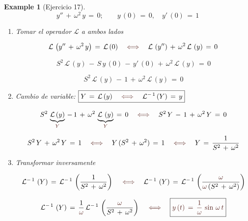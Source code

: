 \documentclass[a4paper,11pt,openany]{book}
\newtheorem{exmp}{Example}[section]
\newcommand*{\itembolasazules}[1]{%
\footnotesize\protect\tikz[baseline=-3pt]%
\protect\node[scale=.7, circle, shade, ball
color=green]{\color{white}\Large\bf#1};}
\begin{document}
\newpage
 
\begin{exmp}[Ejercicio 17]

$$y''\,+\,\omega^{2}\,y\,=\,0; \qquad y\,(0)\,=\,0, \quad y'\,(0)\,=\,1$$
 
\begin{enumerate}[label=\itembolasazules{\arabic*}]
 
 
\item Tomar el operador $\mathcal{L}$ a ambos lados
 
$$\mathcal{L}\,\left(y''\,+\,\omega^{2}\,y \right)\,=\,\mathcal{L}\,(0) \quad \textcolor{caputmortuum}{\iff} \quad \mathcal{L}\,\left(y'' \right)\,+\,\omega^{2}\,\mathcal{L}\,\left(y \right)\,=\,0$$
 
$$S^{2}\,\mathcal{L}\,(y)\,-\,S\,y\,(0)\,-\,y'\,(0)\,+\,\omega^{2}\,\mathcal{L}\,\left(y \right)\,=\,0$$
 
$$S^{2}\,\mathcal{L}\,(y)\,-\,1\,+\,\omega^{2}\,\mathcal{L}\,\left(y \right)\,=\,0$$
 
\item Cambio de variable: $\boxed{Y\,=\,\mathcal{L}\,(y) \quad \textcolor{caputmortuum}{\iff} \quad \mathcal{L}^{-\,1}\,(Y)\,=\,y  }$
 
$$S^{2}\,\underbrace{\mathcal{L}\,(y)}_{\textcolor{caputmortuum}{Y} }\,-\,1\,+\,\omega^{2}\,\underbrace{\mathcal{L}\,\left(y \right)}_{\textcolor{caputmortuum}{Y} }\,=\,0 \quad \textcolor{caputmortuum}{\iff} \quad S^{2}\,Y\,-\,1\,+\,\omega^{2}\,Y\,=\,0$$
 
$$S^{2}\,Y\,+\,\omega^{2}\,Y\,=\,1 \quad \textcolor{caputmortuum}{\iff} \quad Y\,(S^{2}\,+\,\omega^{2})\,=\,1 \quad \textcolor{caputmortuum}{\iff} \quad Y\,=\,\dfrac{1}{S^{2}\,+\,\omega^{2}}$$
 
\item Transformar inversamente 
 
$$\mathcal{L}^{-\,1}\,\left(Y \right)\,=\,\mathcal{L}^{-\,1}\,\left(\dfrac{1}{S^{2}\,+\,\omega^{2}} \right) \quad \textcolor{caputmortuum}{\iff} \quad \mathcal{L}^{-\,1}\,\left(Y \right)\,=\,\mathcal{L}^{-\,1}\,\left(\dfrac{\textcolor{caputmortuum}{\omega} }{\textcolor{caputmortuum}{\omega}\,(S^{2}\,+\,\omega^{2})} \right) $$
 
$$\mathcal{L}^{-\,1}\,\left(Y \right)\,=\,\dfrac{1}{\textcolor{caputmortuum}{\omega}}\,\mathcal{L}^{-\,1}\,\left(\dfrac{\textcolor{caputmortuum}{\omega} }{S^{2}\,+\,\omega^{2}} \right) \quad \textcolor{caputmortuum}{\iff} \quad \boxed{\textcolor{caputmortuum}{y\,(t)\,=\,\dfrac{1}{\omega}\,\sin\,\omega\,t }  }$$
 
\end{enumerate}

\end{exmp}
 
\end{document}

